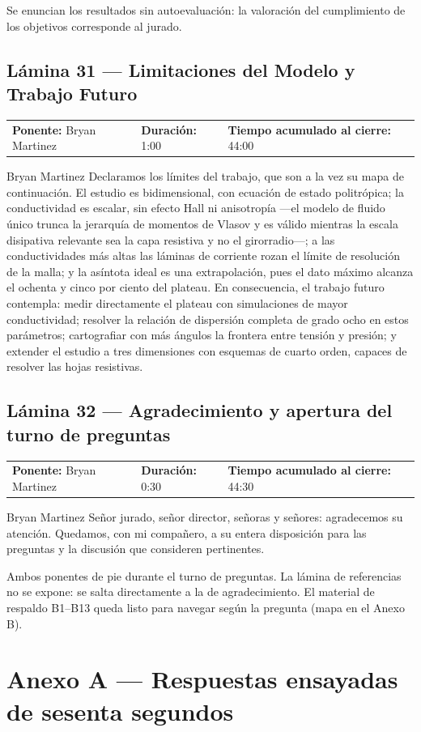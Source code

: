 \documentclass[11pt,letterpaper]{article}
\makeatletter
\newcommand{\lamina}[5]{%
  \subsection*{Lámina #1 --- #2}
  \noindent
  \begin{tabular}{@{}llll@{}}
    \textbf{Ponente:} #3 &\quad \textbf{Duración:} #4 &\quad
    \textbf{Tiempo acumulado al cierre:} #5 &
  \end{tabular}
  \vspace{2pt}}
\makeatother
\begin{document}
\begin{indicaciones}
Se enuncian los resultados sin autoevaluación: la valoración del
cumplimiento de los objetivos corresponde al jurado.
\end{indicaciones}

\lamina{31}{Limitaciones del Modelo y Trabajo Futuro}{Bryan Martinez}{1:00}{44:00}

\begin{parlamento}{Bryan Martinez}
Declaramos los límites del trabajo, que son a la vez su mapa de
continuación. El estudio es bidimensional, con ecuación de estado
politrópica; la conductividad es escalar, sin efecto Hall ni anisotropía
---el modelo de fluido único trunca la jerarquía de momentos de Vlasov y
es válido mientras la escala disipativa relevante sea la capa resistiva y
no el girorradio---; a las conductividades más altas las láminas de
corriente rozan el límite de resolución de la malla; y la asíntota ideal
es una extrapolación, pues el dato máximo alcanza el ochenta y cinco por
ciento del plateau. En consecuencia, el trabajo futuro contempla: medir
directamente el plateau con simulaciones de mayor conductividad; resolver
la relación de dispersión completa de grado ocho en estos parámetros;
cartografiar con más ángulos la frontera entre tensión y presión; y
extender el estudio a tres dimensiones con esquemas de cuarto orden,
capaces de resolver las hojas resistivas.
\end{parlamento}

\lamina{32}{Agradecimiento y apertura del turno de preguntas}{Bryan Martinez}{0:30}{44:30}

\begin{parlamento}{Bryan Martinez}
Señor jurado, señor director, señoras y señores: agradecemos su atención.
Quedamos, con mi compañero, a su entera disposición para las preguntas y
la discusión que consideren pertinentes.
\end{parlamento}

\begin{indicaciones}
Ambos ponentes de pie durante el turno de preguntas. La lámina de
referencias no se expone: se salta directamente a la de agradecimiento. El
material de respaldo B1--B13 queda listo para navegar según la pregunta
(mapa en el Anexo B).
\end{indicaciones}

\appendix
\section{Anexo A --- Respuestas ensayadas de sesenta segundos}
\end{document}
